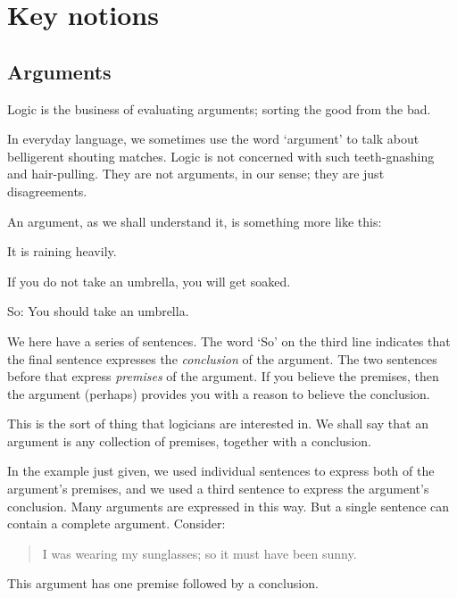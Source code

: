 \part{Key notions}
\label{ch.intro}

\chapter{Arguments}\label{argRaining}\label{s:Arguments}
Logic is the business of evaluating arguments; sorting the good from the bad. 

In everyday language, we sometimes use the word `argument' to talk about belligerent shouting matches. Logic is not concerned with such teeth-gnashing and hair-pulling. They are not arguments, in our sense; they are just disagreements.

An argument, as we shall understand it, is something more like this:
	\begin{earg}
		\item[] It is raining heavily.
		\item[] If you do not take an umbrella, you will get soaked.
		\item[So:] You should take an umbrella.
	\end{earg}
We here have a series of sentences. The word `So' on the third line indicates that the final sentence expresses the \emph{conclusion} of the argument. The two sentences before that express \emph{premises} of the argument. If you believe the premises, then the argument (perhaps) provides you with a reason to believe the conclusion. 

This is the sort of thing that logicians are interested in. We shall say that an argument is any collection of premises, together with a conclusion. 

In the example just given, we used individual sentences to express both of the argument's premises, and we used a third sentence to express the argument's conclusion. Many arguments are expressed in this way. But a single sentence can contain a complete argument. Consider:
	\begin{quote}
		 I was wearing my sunglasses; so it must have been sunny.
	\end{quote}
This argument has one premise followed by a conclusion. 

